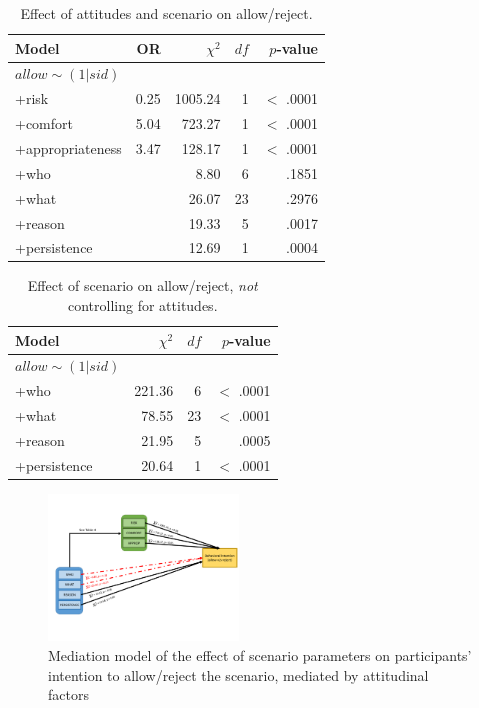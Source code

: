 \begin{table}
\centering
\caption{Effect of attitudes and scenario on allow/reject.}
\label{tab:mediationANOVA}
\begin{tabular}{ l | r | r | r | r }
\hline
Model & OR	&	\textbf{$\chi^2$} & $df$ & $p$-value 	\\ \hline
$allow\sim(1 | sid)$ &	&		  &	    &				\\
+risk &				0.25 &	1005.24  &    1 &		$<$ .0001 \\
+comfort &			5.04 &	723.27  &     1 &		$<$ .0001 \\
+appropriateness &	3.47 &	128.17  &	  1 & 		$<$ .0001 \\ \hline
+who &					&	8.80	& 	  6 & 		.1851 	\\
+what &					&	26.07 &	  	 23 &		.2976 	\\
+reason &				&	19.33 & 	  5 & 		.0017	\\
+persistence &			&	12.69 &	 	  1 & 		.0004 	\\
\hline
\end{tabular}
\end{table}

\begin{table}
\centering
\caption{Effect of scenario on allow/reject, \emph{not} controlling for attitudes.}
\label{tab:marginalANOVA}
\begin{tabular}{ l | r | r | r }
\hline
Model &	$\chi^2$ & $df$ & $p$-value 	\\ \hline
$allow\sim(1 | sid)$ &		  	&	    &				\\
+who &					221.36	& 	  6 & 		$<$ .0001 	\\
+what &					78.55 &		  23 &		$<$ .0001 	\\
+reason &				21.95 & 	  5 & 		  .0005		\\
+persistence &			20.64 &		  1 & 		$<$ .0001 	\\
\hline
\end{tabular}
\end{table}

\begin{figure}
\centering
\includegraphics[width=0.45\textwidth]{figures/allow.pdf}
\caption{Mediation model of the effect of scenario parameters on participants' intention to allow/reject the scenario, mediated by attitudinal factors}
\label{fig:mediationAllow}
\end{figure}

